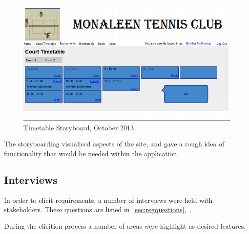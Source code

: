 \begin{figure}[H]
\begin{center}
\includegraphics[width=14cm]{storyboard.png}
\end{center}
\caption{Timetable Storyboard, October 2013}
\label{fig:timetableSB}
\end{figure}

The storyboarding visualised aspects of the site, and gave a rough idea of functionality that would be needed within the application. 

\subsection{Interviews}

In order to elicit requirements, a number of interviews were held with stakeholders. These questions are listed in~\ref{sec:regquestions},~.

During the elicition process a number of areas were highlight as desired features.

